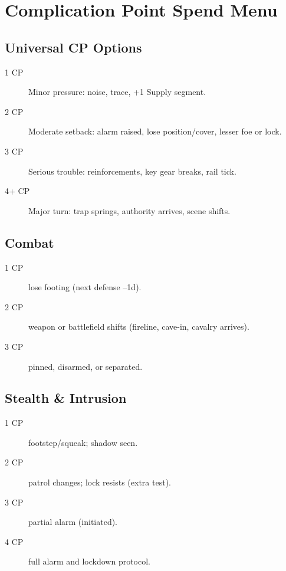 \section{Complication Point Spend Menu}

\subsection{Universal CP Options}

\begin{description}
\item[1 CP] Minor pressure: noise, trace, +1 Supply segment.
\item[2 CP] Moderate setback: alarm raised, lose position/cover, lesser foe or lock.
\item[3 CP] Serious trouble: reinforcements, key gear breaks, rail tick.
\item[4+ CP] Major turn: trap springs, authority arrives, scene shifts.
\end{description}

\subsection{Combat}

\begin{description}
\item[1 CP] lose footing (next defense --1d).
\item[2 CP] weapon or battlefield shifts (fireline, cave-in, cavalry arrives).
\item[3 CP] pinned, disarmed, or separated.
\end{description}

\subsection{Stealth \& Intrusion}

\begin{description}
\item[1 CP] footstep/squeak; shadow seen.
\item[2 CP] patrol changes; lock resists (extra test).
\item[3 CP] partial alarm (initiated).
\item[4 CP] full alarm and lockdown protocol.
\end{description}


